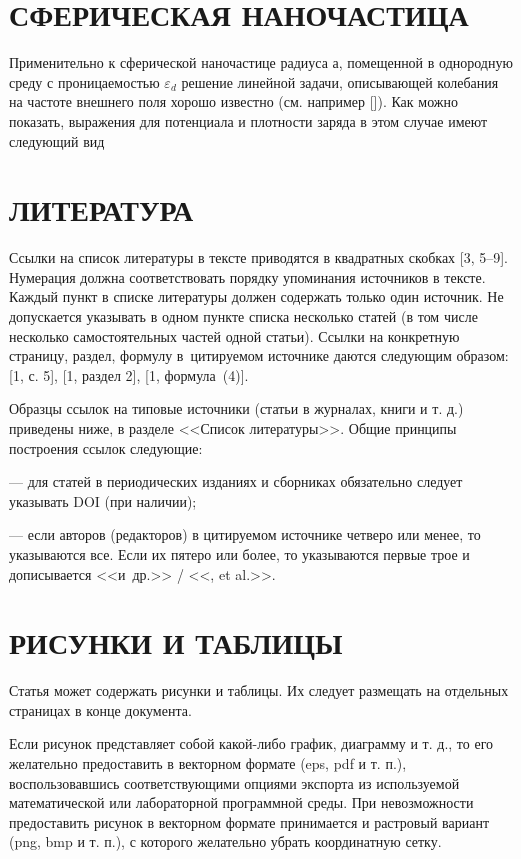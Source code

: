\documentclass[12pt, a4paper]{article}
\def \eps {\varepsilon}
\begin{document}
\section{СФЕРИЧЕСКАЯ НАНОЧАСТИЦА}
Применительно к сферической наночастице радиуса а, помещенной в однородную среду с проницаемостью $\eps_d$ решение линейной задачи, описывающей колебания на частоте внешнего поля хорошо известно (см. например []). Как можно показать, выражения для потенциала и плотности заряда в этом случае имеют следующий вид




\section{ЛИТЕРАТУРА}

Ссылки на список литературы в тексте приводятся в квадратных скобках [3, 5--9]. Нумерация должна соответствовать порядку упоминания источников в тексте. Каждый пункт в списке литературы должен содержать только один источник. Не допускается указывать в одном пункте списка несколько статей (в том числе несколько самостоятельных частей одной статьи). Ссылки на конкретную страницу, раздел, формулу в~цитируемом источнике даются следующим образом: [1, с. 5], [1, раздел 2], [1, формула~(4)].

Образцы ссылок на типовые источники (статьи в журналах, книги и т. д.) приведены ниже, в разделе <<Список литературы>>. Общие принципы построения ссылок следующие:

--- для статей в периодических изданиях и сборниках обязательно следует указывать DOI (при наличии);

--- если авторов (редакторов) в цитируемом источнике четверо или менее, то указываются все. Если их пятеро или более, то указываются первые трое и дописывается <<и~др.>> / <<, et al.>>.

\section{РИСУНКИ И ТАБЛИЦЫ}

Статья может содержать рисунки и таблицы. Их следует размещать на отдельных страницах в конце документа.

Если рисунок представляет собой какой-либо график, диаграмму и т. д., то его желательно предоставить в векторном формате (eps, pdf и т. п.), воспользовавшись соответствующими опциями экспорта из используемой математической или лабораторной программной среды. При невозможности предоставить рисунок в векторном формате принимается и растровый вариант (png, bmp и т. п.), с которого желательно убрать координатную сетку.
\end{document}
